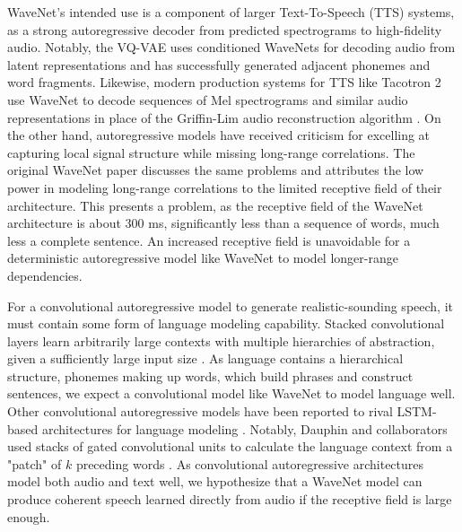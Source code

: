 WaveNet's intended use is a component of larger Text-To-Speech (TTS) systems, as a strong autoregressive decoder from predicted spectrograms to high-fidelity audio. 
\cite{wang_tacotron_2017, oord_parallel_2017, oord_neural_2018, chorowski_unsupervised_2019}
Notably, the VQ-VAE uses conditioned WaveNets for decoding audio from latent representations and has successfully generated adjacent phonemes and word fragments. \cite{oord_neural_2018, garbacea_low_2019, dieleman_variable-rate_2021}
Likewise, modern production systems for TTS like Tacotron 2 use WaveNet to decode sequences of Mel spectrograms and similar audio representations in place of the Griffin-Lim audio reconstruction algorithm \cite{shen_natural_2018}.
On the other hand, autoregressive models have received criticism for excelling at capturing local signal structure while missing long-range correlations. \cite{dieleman_challenge_2018}
The original WaveNet paper discusses the same problems and attributes the low power in modeling long-range correlations to the limited receptive field of their architecture. \cite{oord_wavenet_2016, shen_natural_2018}
This presents a problem, as the receptive field of the WaveNet architecture is about 300 ms, significantly less than a sequence of words, much less a complete sentence.\cite{oord_wavenet_2016}
An increased receptive field is unavoidable for a deterministic autoregressive model like WaveNet to model longer-range dependencies.


For a convolutional autoregressive model to generate realistic-sounding speech, it must contain some form of language modeling capability.
Stacked convolutional layers learn arbitrarily large contexts with multiple hierarchies of abstraction, given a sufficiently large input size \cite{lecun_convolutional_1998}. 
As language contains a hierarchical structure, phonemes making up words, which build phrases and construct sentences, we expect a convolutional model like WaveNet to model language well.
Other convolutional autoregressive models have been reported to rival LSTM-based architectures for language modeling \cite{bai_empirical_2018}.
Notably, Dauphin and collaborators used stacks of gated convolutional units to calculate the language context from a "patch" of $k$ preceding words \cite{dauphin_language_2017}.
As convolutional autoregressive architectures model both audio and text well, we hypothesize that a WaveNet model can produce coherent speech learned directly from audio if the receptive field is large enough.


